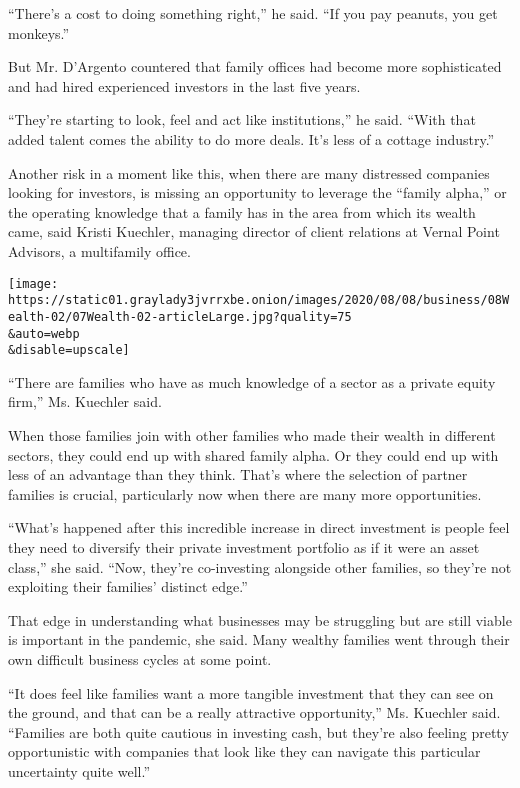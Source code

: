 ``There's a cost to doing something right,'' he said. ``If you pay
peanuts, you get monkeys.''

But Mr. D'Argento countered that family offices had become more
sophisticated and had hired experienced investors in the last five
years.

``They're starting to look, feel and act like institutions,'' he said.
``With that added talent comes the ability to do more deals. It's less
of a cottage industry.''

Another risk in a moment like this, when there are many distressed
companies looking for investors, is missing an opportunity to leverage
the ``family alpha,'' or the operating knowledge that a family has in
the area from which its wealth came, said Kristi Kuechler, managing
director of client relations at Vernal Point Advisors, a multifamily
office.

\texttt{[image: https://static01.graylady3jvrrxbe.onion/images/2020/08/08/business/08Wealth-02/07Wealth-02-articleLarge.jpg?quality=75\\\&auto=webp\\\&disable=upscale]}

``There are families who have as much knowledge of a sector as a private
equity firm,'' Ms. Kuechler said.

When those families join with other families who made their wealth in
different sectors, they could end up with shared family alpha. Or they
could end up with less of an advantage than they think. That's where the
selection of partner families is crucial, particularly now when there
are many more opportunities.

``What's happened after this incredible increase in direct investment is
people feel they need to diversify their private investment portfolio as
if it were an asset class,'' she said. ``Now, they're co-investing
alongside other families, so they're not exploiting their families'
distinct edge.''

That edge in understanding what businesses may be struggling but are
still viable is important in the pandemic, she said. Many wealthy
families went through their own difficult business cycles at some point.

``It does feel like families want a more tangible investment that they
can see on the ground, and that can be a really attractive
opportunity,'' Ms. Kuechler said. ``Families are both quite cautious in
investing cash, but they're also feeling pretty opportunistic with
companies that look like they can navigate this particular uncertainty
quite well.''

